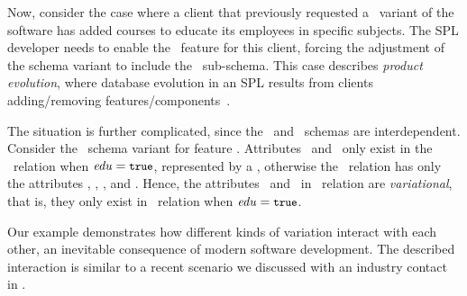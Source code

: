 Now, consider the case where a client that previously requested a \basic\ variant of the
software has added courses to educate its
employees in specific subjects. The SPL developer needs to enable
the \edu\ feature for this client, forcing the adjustment of the schema variant
to include the \educational\ sub-schema.
This case describes \emph{product evolution}, where
database evolution in an SPL results
from clients adding/removing features/components~\cite{dbSPLevolve}. 

The situation is further complicated, since the \basic\ and \educational\
schemas are interdependent.
Consider
the \basic\ schema 
variant for feature \vFour. Attributes \isstudent\ and \isteacher\ only exist
in the \empacct\ relation when $\edu=\t$, represented by a ,
otherwise the \empacct\
relation has only the attributes \empno, \hiredate, \titleatt, and \deptno.
Hence, the attributes \isstudent\ and \isteacher\ in \empacct\ relation are
\emph{variational}, that is, they only exist in \empacct\ relation
when $\edu=\t$.


Our example demonstrates how different kinds of variation
interact with each other, an inevitable consequence of modern software
development.
The described interaction is similar to a recent scenario we discussed with an
industry contact in .
